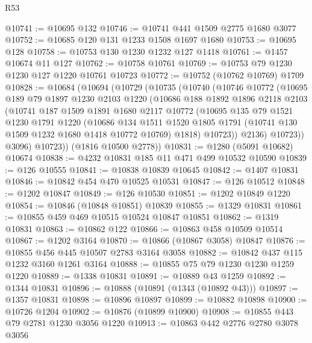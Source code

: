 \begin{lexlean}{R53}
\begin{coremodule}
@10741 := @10695 @132
@10746 := @10741 @441 @1509 @2775 @1680 @3077
@10752 := @10685 @120 @131 @1233 @1508 @1697 @1680
@10753 := @10695 @128
@10758 := @10753 @130 @1230 @1232 @127 @1418
@10761 := @1457 @10674 @11 @127
@10762 := @10758 @10761
@10769 := @10753 @79 @1230 @1230 @127 @1220 @10761 @10723
@10772 := @10752 (@10762 @10769) @1709
@10828 := @10684
    (@10694
      (@10729
        (@10735
          (@10740
            (@10746
              @10772
              (@10695
                @189
                @79
                @1897
                @1230
                @2103
                @1220
                (@10686
                  @188
                  @1892
                  @1896
                  @2118
                  @2103
                  (@10741
                    @187
                    @1509
                    @1891
                    @1680
                    @2117
                    @10772
                    (@10695
                      @135
                      @79
                      @1521
                      @1230
                      @1791
                      @1220
                      (@10686
                        @134
                        @1511
                        @1520
                        @1805
                        @1791
                        (@10741 @130 @1509 @1232 @1680 @1418 @10772 @10769)
                        @1818)
                      @10723))
                  @2136)
                @10723))
            @3096)
          @10723))
      (@1816 @10500 @2778))
@10831 := @1280 (@5091 @10682) @10674
@10838 := @4232 @10831 @185 @11 @471 @499 @10532 @10590
@10839 := @126 @10555
@10841 := @10838 @10839 @10645
@10842 := @1407 @10831
@10846 := @10842 @454 @470 @10525 @10531
@10847 := @126 @10512
@10848 := @1202 @10847
@10849 := @126 @10530
@10851 := @1202 @10849 @1220
@10854 := @10846 (@10848 @10851) @10839
@10855 := @1329 @10831
@10861 := @10855 @459 @469 @10515 @10524 @10847 @10851
@10862 := @1319 @10831
@10863 := @10862 @122
@10866 := @10863 @458 @10509 @10514
@10867 := @1202 @3164
@10870 := @10866 (@10867 @3058) @10847
@10876 := @10855 @456 @445 @10507 @2783 @3164 @3058
@10882 := @10842 @437 @115 @1232 @3160 @1261 @3164
@10888 := @10855 @75 @79 @1230 @1230 @1259 @1220
@10889 := @1338 @10831
@10891 := @10889 @43 @1259
@10892 := @1344 @10831
@10896 := @10888 (@10891 (@1343 (@10892 @43)))
@10897 := @1357 @10831
@10898 := @10896 @10897
@10899 := @10882 @10898
@10900 := @10726 @1204
@10902 := @10876 (@10899 @10900)
@10908 := @10855 @443 @79 @2781 @1230 @3056 @1220
@10913 := @10863 @442 @2776 @2780 @3078 @3056

\end{coremodule}
\end{lexlean}
